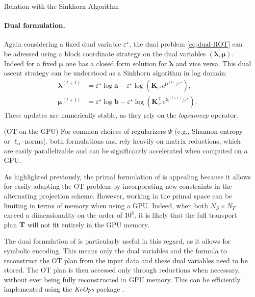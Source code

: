 \begin{mem1}{Relation with the Sinkhorn Algorithm}
    \paragraph{Dual formulation.} Again considering a fixed dual variable $\varepsilon^\star$, the dual problem \eqref{eq:dual-ROT} can be adressed using a block coordinate strategy on the dual variables $(\bm{\lambda}, \bm{\mu})$. Indeed for a fixed $\bm{\mu}$ one has a closed form solution for $\bm{\lambda}$ and vice versa. This dual ascent strategy can be understood as a Sinkhorn algorithm in log domain:
    \begin{align}
        \bm{\lambda}^{(t+1)} &= \varepsilon^\star \log \mathbf{a} - \varepsilon^\star \log \left( \mathbf{K}_{\varepsilon^\star} e^{\bm{\mu}^{(t)} / \varepsilon^\star} \right), \\
        \bm{\mu}^{(t+1)} &= \varepsilon^\star \log \mathbf{b} - \varepsilon^\star \log \left( \mathbf{K}^\top_{\varepsilon^\star} e^{\bm{\lambda}^{(t+1)} / \varepsilon^\star} \right).
    \end{align}
    These updates are numerically stable, as they rely on the \emph{logsumexp} operator.
\end{mem1}

\begin{remark}{(OT on the GPU)}
    For common choices of regularizers $\Psi$ (e.g., Shannon entropy or $\ell_\alpha$-norms), both formulations  and  rely heavily on matrix reductions, which are easily parallelizable and can be significantly accelerated when computed on a GPU.
    
    As highlighted previously, the primal formulation of  is appealing because it allows for easily adapting the OT problem by incorporating new constraints in the alternating projection scheme. However, working in the primal space can be limiting in terms of memory when using a GPU. Indeed, when both $N_S \times N_T$ exceed a dimensionality on the order of $10^8$, it is likely that the full transport plan ${\mathbf{T}}$ will not fit entirely in the GPU memory.
    
    The dual formulation of  is particularly useful in this regard, as it allows for symbolic encoding. This means only the dual variables and the formula to reconstruct the OT plan from the input data and these dual variables need to be stored. The OT plan is then accessed only through reductions when necessary, without ever being fully reconstructed in GPU memory. This can be efficiently implemented using the \emph{KeOps} package \citep{charlier2021kernel}.
\end{remark}
    
